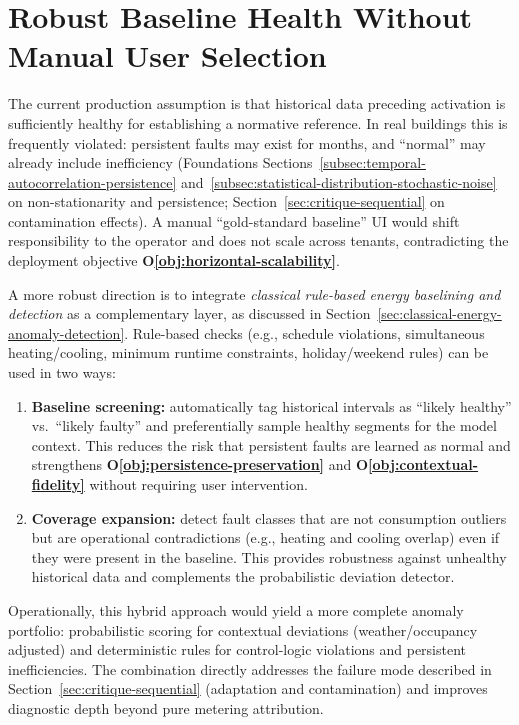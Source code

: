 \section{Robust Baseline Health Without Manual User Selection}
\label{sec:baseline-health-future}

The current production assumption is that historical data preceding activation is
sufficiently healthy for establishing a normative reference. In real buildings this
is frequently violated: persistent faults may exist for months, and ``normal'' may
already include inefficiency (Foundations Sections~\ref{subsec:temporal-autocorrelation-persistence}
and~\ref{subsec:statistical-distribution-stochastic-noise} on non-stationarity and
persistence; Section~\ref{sec:critique-sequential} on contamination effects). A manual
``gold-standard baseline'' UI would shift responsibility to the operator and does not
scale across tenants, contradicting the deployment objective
\textbf{O\ref{obj:horizontal-scalability}}.

A more robust direction is to integrate \emph{classical rule-based energy baselining
and detection} as a complementary layer, as discussed in
Section~\ref{sec:classical-energy-anomaly-detection}. Rule-based checks (e.g., schedule
violations, simultaneous heating/cooling, minimum runtime constraints, holiday/weekend
rules) can be used in two ways:

\begin{enumerate}
    \item \textbf{Baseline screening:} automatically tag historical intervals as
    ``likely healthy'' vs.\ ``likely faulty'' and preferentially sample healthy
    segments for the model context. This reduces the risk that persistent faults are
    learned as normal and strengthens \textbf{O\ref{obj:persistence-preservation}} and
    \textbf{O\ref{obj:contextual-fidelity}} without requiring user intervention.

    \item \textbf{Coverage expansion:} detect fault classes that are not consumption
    outliers but are operational contradictions (e.g., heating and cooling overlap)
    even if they were present in the baseline. This provides robustness against
    unhealthy historical data and complements the probabilistic deviation detector.
\end{enumerate}

Operationally, this hybrid approach would yield a more complete anomaly portfolio:
probabilistic scoring for contextual deviations (weather/occupancy adjusted) and
deterministic rules for control-logic violations and persistent inefficiencies. The
combination directly addresses the failure mode described in
Section~\ref{sec:critique-sequential} (adaptation and contamination) and improves
diagnostic depth beyond pure metering attribution.

